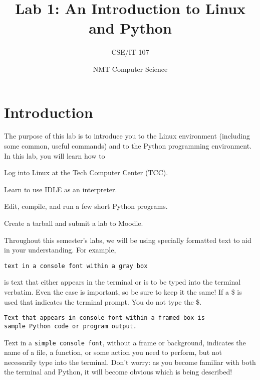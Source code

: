\documentclass[12pt]{article}
\title{Lab 1: An Introduction to Linux and Python}
\author{CSE/IT 107}
\date{NMT Computer Science}
\begin{document}
\maketitle

\section{Introduction}

The purpose of this lab is to introduce you to the Linux environment (including some common, useful commands) and to the Python programming environment. In this lab, you will learn how to
\begin{enumerate*}
\item Log into Linux at the Tech Computer Center (TCC).
\item Learn to use IDLE as an interpreter.
\item Edit, compile, and run a few short Python programs.
\item Create a tarball and submit a lab to Moodle.
\end{enumerate*}


Throughout this semester's labs, we will be using specially formatted text to aid in your understanding. For example,
\begin{lstlisting}[style=bash]
text in a console font within a gray box
\end{lstlisting}
is text that either appears in the terminal or is to be typed into the terminal verbatim. Even the case is important, so be sure to keep it the same! If a \$ is used that indicates the terminal prompt. You do not type the \$.

\vspace{12pt}

\begin{lstlisting}[style=c]
Text that appears in console font within a framed box is 
sample Python code or program output.
\end{lstlisting}

\vspace{12pt}

Text in a \texttt{simple console font}, without a frame or background, indicates the name of a file, a function, or some action you need to perform, but not necessarily type into the terminal. Don't worry: as you become familiar with both the terminal and Python, it will become obvious which is being described!
\end{document}
